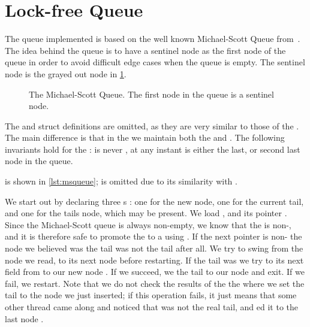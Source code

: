 \section{Lock-free Queue\label{sec:usage-queue}}


The queue implemented is based on the well known Michael-Scott Queue from~\cite{michael1996simple}.
The idea behind the queue is to have a sentinel node as the first node of the queue in order to
avoid difficult edge cases when the queue is empty. The sentinel node is the grayed out node in
\cref{fig:msqueue}.

\begin{figure}[b]
\centering

  \caption{The Michael-Scott Queue. The first node in the queue is a sentinel
  node.\label{fig:msqueue}}
\end{figure}

The  and  struct definitions are omitted, as they are very similar to
those of the . The main difference is that in the  we maintain both the
 and . The following invariants hold for the :  is
never , at any instant  is either the last, or second last node in the
queue.

 is shown in \cref{lst:msqueue};  is omitted due
to its similarity with .

\begin{figure}[ht]

\end{figure}


We start out by declaring three s : one for the new node, one for the
current tail, and one for the tails  node, which may be present.  We load 
, and its  pointer .  Since the Michael-Scott queue is always
non-empty, we know that the  is non-, and it is therefore safe to promote the
 to a  using .  If the next pointer is non-
the node we believed was the tail was not the tail after all. We try to swing  from the
node we read, to its next node  before restarting.  If the tail was  we try
to  its next field from  to our new node . If we succeed, we
 the tail to our node and exit. If we fail, we restart.  Note that we do not check the
results of the the  where we set the tail to the node we just inserted; if this operation
fails, it just means that some other thread came along and noticed that  was not the
real tail, and ed it to the last node .



